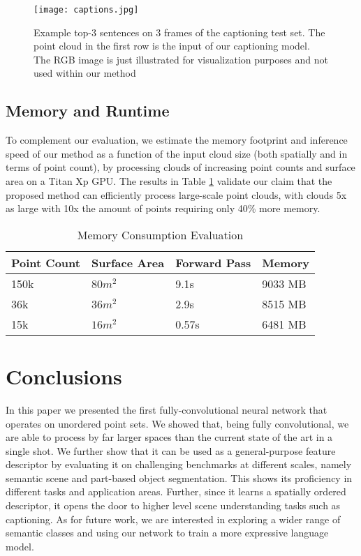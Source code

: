 \documentclass[runningheads]{llncs}
\begin{document}
\begin{figure}[t]
    \centering
 \texttt{[image: captions.jpg]} 
    \caption{Example top-3 sentences on 3 frames of the captioning test set. The point cloud in the first row is the input of our captioning model. The RGB image is just illustrated for visualization purposes and not used within our method}
    \label{fig:captiong_result} 
\end{figure}

\subsection{Memory and Runtime}

To complement our evaluation, we estimate the memory footprint and inference speed of our method as a function of the input cloud size (both spatially and in terms of point count), by processing clouds of increasing point counts and surface area on a Titan Xp GPU. The results in Table \ref{table:runtime} validate our claim that the proposed method can efficiently process large-scale point clouds, with clouds 5x as large with 10x the amount of points requiring only 40\% more memory.

\begin{table}[h]
\setlength{\tabcolsep}{1em}
\centering
\caption{Memory Consumption Evaluation}
\label{table:runtime}
{{\renewcommand{\arraystretch}{1.1}\begin{tabular}{l l l l}
\textbf{Point Count} & \textbf{Surface Area} & \textbf{Forward Pass} & \textbf{Memory} \\
\hline
150k & $80m^2$ & 9.1s & 9033 MB\\
36k & $36m^2$ & 2.9s & 8515 MB\\
15k & $16m^2$ & 0.57s & 6481 MB\\                 
\end{tabular}}}
\end{table}

\section{Conclusions}

In this paper we presented the first fully-convolutional neural network that operates on unordered point sets. We showed that, being fully convolutional, we are able to process by far larger spaces than the current state of the art in a single shot. We further show that it can be used as a general-purpose feature descriptor by evaluating it on challenging benchmarks at different scales, namely semantic scene and part-based object segmentation. This shows its proficiency in different tasks and application areas. Further, since it learns a spatially ordered descriptor, it opens the door to higher level scene understanding tasks such as captioning. As for future work, we are interested in exploring a wider range of semantic classes and using our network to train a more expressive language model.



\end{document}
